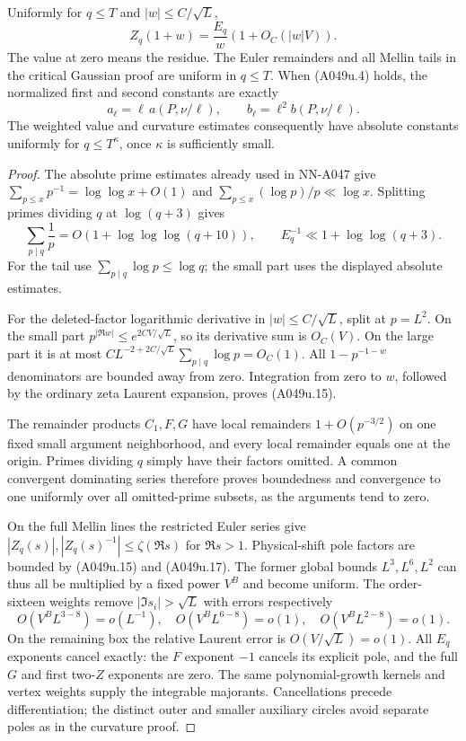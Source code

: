 \begin{lemma}
\label{lem:A049-uniform-euler}
Uniformly for $q\le T$ and $|w|\le C/\sqrt L$,
\[
 Z_q(1+w)=\frac{E_q}{w}(1+O_C(|w|V)).
\tag{A049u.15}
\]
The value at zero means the residue. The Euler remainders
and all Mellin tails in the critical Gaussian proof are
uniform in $q\le T$. When (A049u.4) holds, the normalized
first and second constants are exactly
\[
 a_\ell=\ell\,a(P,\nu/\ell),\qquad
 b_\ell=\ell^2b(P,\nu/\ell).
\tag{A049u.16}
\]
The weighted value and curvature estimates consequently
have absolute constants uniformly for $q\le T^\kappa$,
once $\kappa$ is sufficiently small.
\end{lemma}

\begin{proof}
The absolute prime estimates already used in NN-A047 give
$\sum_{p\le x}p^{-1}=\log\log x+O(1)$ and
$\sum_{p\le x}(\log p)/p\ll\log x$.
Splitting primes dividing $q$ at $\log(q+3)$ gives
\[
 \sum_{p\mid q}\frac1p=O(1+\log\log\log(q+10)),\qquad
 E_q^{-1}\ll1+\log\log(q+3).
\tag{A049u.17}
\]
For the tail use $\sum_{p\mid q}\log p\le\log q$;
the small part uses the displayed absolute estimates.

For the deleted-factor logarithmic derivative in
$|w|\le C/\sqrt L$, split at $p=L^2$.
On the small part $p^{|\Re w|}\le e^{2CV/\sqrt L}$,
so its derivative sum is $O_C(V)$. On the large part
it is at most
$CL^{-2+2C/\sqrt L}\sum_{p\mid q}\log p=O_C(1)$.
All $1-p^{-1-w}$ denominators are bounded away from zero.
Integration from zero to $w$, followed by the ordinary
zeta Laurent expansion, proves (A049u.15).

The remainder products $C_1,F,G$ have local remainders
$1+O(p^{-3/2})$ on one fixed small argument neighborhood,
and every local remainder equals one at the origin.
Primes dividing $q$ simply have their factors omitted.
A common convergent dominating series therefore proves
boundedness and convergence to one uniformly over all
omitted-prime subsets, as the arguments tend to zero.

On the full Mellin lines the restricted Euler series give
$|Z_q(s)|,|Z_q(s)^{-1}|\le\zeta(\Re s)$ for $\Re s>1$.
Physical-shift pole factors are bounded by (A049u.15)
and (A049u.17). The former global bounds $L^3,L^6,L^2$
can thus all be multiplied by a fixed power $V^B$
and become uniform. The order-sixteen weights remove
$|\Im s_i|>\sqrt L$ with errors respectively
\[
 O(V^B L^{3-8})=o(L^{-1}),\quad
 O(V^B L^{6-8})=o(1),\quad O(V^B L^{2-8})=o(1).
\]
On the remaining box the relative Laurent error is
$O(V/\sqrt L)=o(1)$. All $E_q$ exponents cancel exactly:
the $F$ exponent $-1$ cancels its explicit pole, and
the full $G$ and first two-$Z$ exponents are zero.
The same polynomial-growth kernels and vertex weights
supply the integrable majorants. Cancellations precede
differentiation; the distinct outer and smaller auxiliary
circles avoid separate poles as in the curvature proof.


\end{proof}
